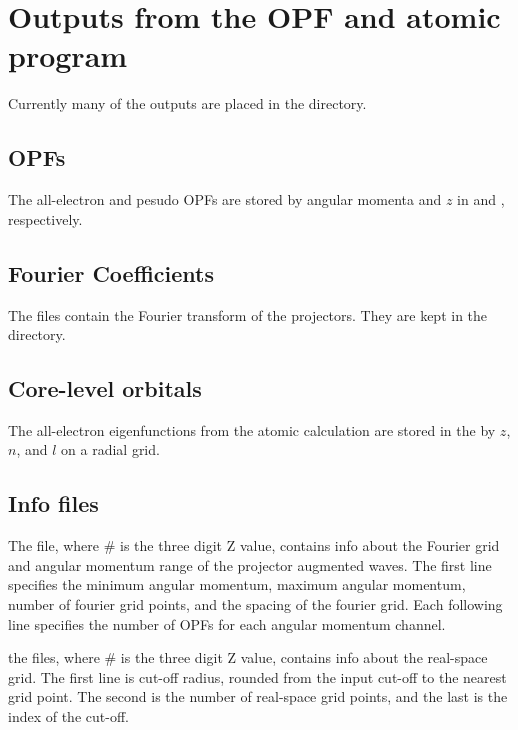 \documentclass[11pt]{report}
\begin{document}
\section{Outputs from the OPF and atomic program}
Currently many of the outputs are placed in the  directory.

\subsection{OPFs}
The all-electron and pesudo OPFs are stored by angular momenta and $z$ in  and , respectively.

\subsection{Fourier Coefficients}
The  files contain the Fourier transform of the projectors. They are kept in the  directory.

\subsection{Core-level orbitals}
The all-electron eigenfunctions from the atomic calculation are stored in the  by $z$, $n$, and $l$ on a radial grid.


\subsection{Info files}
The  file, where \# is the three digit Z value, contains info about the Fourier grid and angular momentum range of the projector augmented waves. The first line specifies the minimum angular momentum, maximum angular momentum, number of fourier grid points, and the spacing of the fourier grid. Each following line specifies the number of OPFs for each angular momentum channel. 

the  files, where \# is the three digit Z value, contains info about the real-space grid. The first line is cut-off radius, rounded from the input cut-off to the nearest grid point. The second is the number of real-space grid points, and the last is the index of the cut-off.
\end{document}
